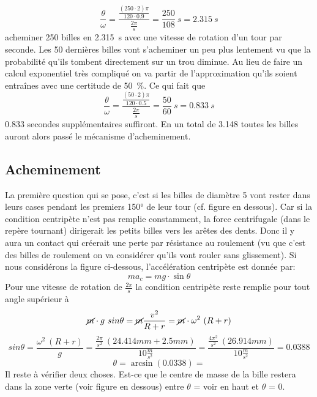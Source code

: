 
\[\frac{\theta}{\omega} = \frac{\frac{(250 \cdot 2)\pi}{120 \cdot 0.9}}{\frac{2\pi}{s}} = \frac{250}{108} \ s = 2.315 \ s \]
acheminer 250 billes en \SI{2.315}{\s} avec une vitesse de rotation d'un tour par seconde.
Les \num{50} dernières billes vont s'acheminer un peu plus lentement vu que la probabilité qu'ils tombent directement sur un trou diminue. Au lieu de faire un calcul exponentiel très compliqué on va partir de l'approximation qu'ils soient entraînes avec une certitude de \SI{50}{\percent}. Ce qui fait que
\[\frac{\theta}{\omega} = \frac{\frac{(50 \cdot 2)\pi}{120 \cdot 0.5}}{\frac{2 \pi}{s}} = \frac{50}{60} \ s = 0.833 \ s\]
0.833 secondes supplémentaires suffiront.
En un total de \SI{3.148}{\sec} toutes les billes auront alors passé le mécanisme d'acheminement.

\subsection{Acheminement}
La première question qui se pose, c'est si les billes de diamètre 5 vont rester dans leurs cases pendant les premiers \ang{150} de leur tour (cf. figure en dessous). Car si la condition centripète n'est pas remplie constamment, la force centrifugale (dans le repère tournant) dirigerait les petits billes vers les arêtes des dents. Donc il y aura un contact qui créerait une perte par résistance au roulement (vu que c'est des billes de roulement on va considérer qu'ils vont rouler sans glissement). Si nous considérons la figure ci-dessous, l'accélération centripète est donnée par:
\[ma_{c} = mg \cdot \sin\theta\]
Pour une vitesse de rotation de \(\frac{2 \pi}{s}\) la condition centripète reste remplie pour tout angle supérieur à %
\[\cancel{m} \cdot g \ sin\theta = \cancel{m} \frac{v^{2}}{R + r} = \cancel{m} \cdot \omega^{2} \ (R +r)\]
\[sin \theta = \frac{\omega^{2} \ (R + r)}{g} = \frac{\frac{2 \pi}{s^{2}}\ (24.414mm + 2.5mm)}{10\frac{m}{s^{2}}} = \frac{\frac{4 \pi^{2}}{s^{2}} \ (26.914mm)}{10\frac{m}{s^{2}}} = 0.0388\]
\[\theta = \arcsin(0.0338) = \]
Il reste à vérifier deux choses. Est-ce que le centre de masse de la bille restera dans la zone verte (voir figure en dessous) entre $\theta$ = voir en haut et $\theta$ = 0.
